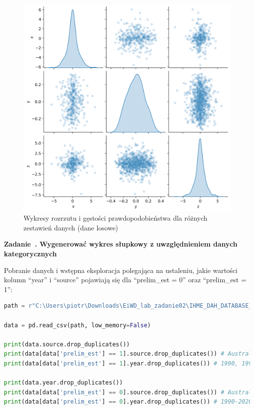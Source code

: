 \documentclass[11pt]{report}
\newcounter{zadanie}
\newcommand{\zadanie}[1]{
    \refstepcounter{zadanie}
    \filbreak\vspace*{1cm}
    {\noindent\raggedright\Large \textbf{Zadanie~\thezadanie. #1}}
    \vspace{10 pt}\nopagebreak[1]
}
\begin{document}
\begin{figure}[h]
    \caption{Wykresy rozrzutu i gęstości prawdopodobieństwa dla różnych zestawień danych (dane losowe)}
    \label{fig:wykres18}
    \centering
    \includegraphics[width=.8\textwidth]{wykres19}
\end{figure}

\zadanie{Wygenerować wykres słupkowy z uwzględnieniem danych kategorycznych}

Pobranie danych i wstępna eksploracja polegająca na ustaleniu, jakie wartości kolumn \enquote{year} i \enquote{source} pojawiają się dla
\enquote{prelim\_est = 0} oraz \enquote{prelim\_est = 1}:

\begin{lstlisting}[language=Python]
path = r"C:\Users\piotr\Downloads\EiWD_lab_zadanie02\IHME_DAH_DATABASE_1990_2020_Y2021M09D22.CSV"

data = pd.read_csv(path, low_memory=False)

print(data.source.drop_duplicates())
print(data[data['prelim_est'] == 1].source.drop_duplicates()) # Australia, Austra, Belgium, Canada, Denmark, Finland, Germany, Greece...
print(data[data['prelim_est'] == 1].year.drop_duplicates()) # 1990, 1991, 2017, 2018, 2019, 2020

print(data.year.drop_duplicates())
print(data[data['prelim_est'] == 0].source.drop_duplicates()) # Australia, Austria, Belgium, Canada, China, Denmark, Finland, France, Germany, Greece...
print(data[data['prelim_est'] == 0].year.drop_duplicates()) # 1990-2020
\end{lstlisting}
\end{document}
